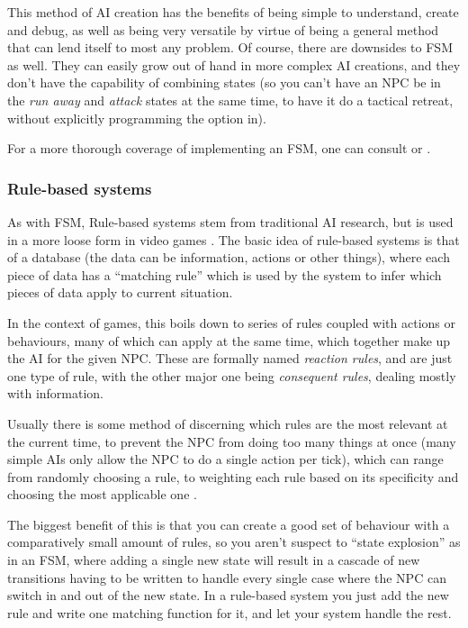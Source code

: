 \documentclass[]{report}
\begin{document}
This method of AI creation has the benefits of being simple to understand,
create and debug, as well as being very versatile by virtue of being a general
method that can lend itself to most any problem. Of course, there are downsides
to FSM as well. They can easily grow out of hand in more complex AI creations,
and they don't have the capability of combining states (so you can't have an NPC
be in the \emph{run away} and \emph{attack} states at the same time, to have it
do a tactical retreat, without explicitly programming the option in).

For a more thorough coverage of implementing an FSM, one can consult
\citet{rabin2002implementing} or \citet[][chap.~3]{kirby2011introduction}.

\subsubsection{Rule-based systems}
\label{sec:rule-based-systems}

As with FSM, Rule-based systems stem from traditional AI research, but is used
in a more loose form in video games \citep{christian2002simple}. The basic idea
of rule-based systems is that of a database (the data can be information,
actions or other things), where each piece of data has a ``matching rule'' which
is used by the system to infer which pieces of data apply to current situation.

In the context of games, this boils down to series of rules coupled with actions
or behaviours, many of which can apply at the same time, which together make up
the AI for the given NPC. These are formally named \emph{reaction rules}, and
are just one type of rule, with the other major one being \emph{consequent
  rules}, dealing mostly with information.

Usually there is some method of discerning which rules are the most relevant at
the current time, to prevent the NPC from doing too many things at once (many
simple AIs only allow the NPC to do a single action per tick), which can range
from randomly choosing a rule, to weighting each rule based on its specificity
and choosing the most applicable one \citep{Freeman-Hargis}.

The biggest benefit of this is that you can create a good set of behaviour with
a comparatively small amount of rules, so you aren't suspect to ``state
explosion'' as in an FSM, where adding a single new state will result in a
cascade of new transitions having to be written to handle every single case
where the NPC can switch in and out of the new state. In a rule-based system you
just add the new rule and write one matching function for it, and let your
system handle the rest.
\end{document}
